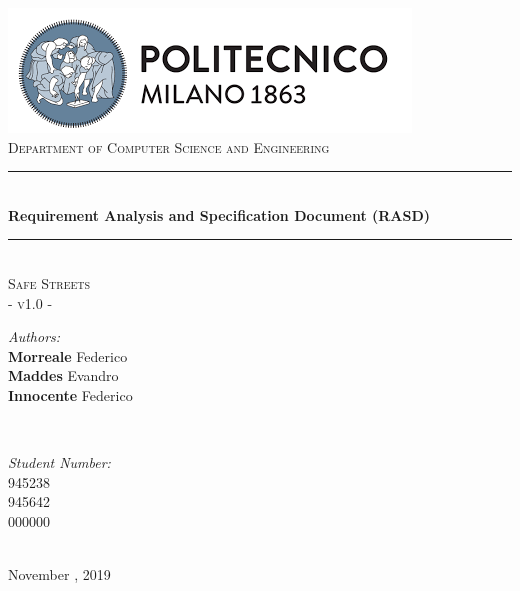 \documentclass[a4paper, hidelinks, 12pt]{report}
\begin{document}
	\begin{titlepage}
		\centering
		\vspace*{0.7 cm}
		\includegraphics[scale = 0.85]{assets/polimi.png}\\[1.6 cm]
		\textsc{\large Department of Computer Science and Engineering}\\[1.8 cm]

		\rule{\linewidth}{0.2 mm} \\[0.4 cm]
		{ \huge \bfseries Requirement Analysis and Specification Document (RASD)}\\
		\rule{\linewidth}{0.2 mm} \\[1.5 cm]

		\textsc{\Large Safe Streets}\\[0.5 cm]
		\textsc{\large - v1.0 -}\\[1 cm]

		\begin{minipage}{0.4\textwidth}
			\begin{flushleft} \large
				\emph{Authors:}\\
				\textbf{Morreale} Federico \\
				\textbf{Maddes} Evandro \\
				\textbf{Innocente} Federico
			\end{flushleft}
		\end{minipage}~
		\begin{minipage}{0.4\textwidth}
			\begin{flushright} \large
				\emph{Student Number:} \\
				945238 \\
				945642 \\
				000000
			\end{flushright}
		\end{minipage}\\[2 cm]

		{\large November  , 2019}\\[2 cm]

		\vfill
	\end{titlepage}

	\tableofcontents
	\newpage
	\clearpage
	\setcounter{page}{1}
\end{document}
